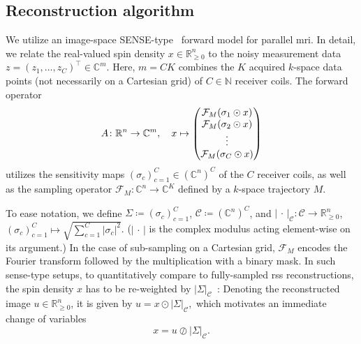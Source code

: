 \documentclass[twocolumn]{article}
\newcommand{\R}{\mathbb{R}}
\newcommand{\Function}[3]{#1\colon#2\to#3}
\begin{document}
\subsection{Reconstruction algorithm}%
\label{ssec:mri}
We utilize an image-space SENSE-type~\cite{pruessmann} forward model for parallel \gls{mri}.
In detail, we relate the real-valued spin density \( x \in \R^n_{\geq 0} \) to the noisy measurement data \( z = {(z_1,\dotsc,z_C)}^\top \in \mathbb{C}^{m} \).
Here, \( m = CK \) combines the \( K \) acquired \( k \)-space data points (not necessarily on a Cartesian grid) of \( C \in \mathbb{N} \) receiver coils.
The forward operator
\begin{equation}
	 \Function{A}{\R^n}{\mathbb{C}^m}, \quad x \mapsto \begin{pmatrix}
		\mathcal{F}_M(\sigma_1 \odot x) \\
		\mathcal{F}_M(\sigma_2 \odot x) \\
		\vdotswithin{\mathcal{F}_M(\sigma_1 \odot x)} \\
		\mathcal{F}_M(\sigma_{C} \odot x)
	\end{pmatrix}
\end{equation}
utilizes the sensitivity maps \( {(\sigma_c)}_{c=1}^{C} \in {(\mathbb{C}^n)}^{C} \) of the \( C \) receiver coils, as well as the sampling operator \( \Function{\mathcal{F}_M}{\mathbb{C}^n}{\mathbb{C}^{K}} \) defined by a \( k \)-space trajectory \( M \).

To ease notation, we define \( \Sigma \coloneqq {(\sigma_c)}_{c=1}^C \), \( \mathcal{C} \coloneqq {(\mathbb{C}^n)}^C \), and \( |\,\cdot\,|_{\mathcal{C}} \colon \mathcal{C} \to \R^n_{\geq 0} \), \( {(\sigma_c)}_{c=1}^C \mapsto \sqrt{\sum_{c=1}^C |\sigma_c|^2} \). (\( |\,\cdot\,| \) is the complex modulus acting element-wise on its argument.)
In the case of sub-sampling on a Cartesian grid, \( \mathcal{F}_M \) encodes the Fourier transform followed by the multiplication with a binary mask.
In such \gls{sense}-type setups, to quantitatively compare to fully-sampled \gls{rss} reconstructions, the spin density \( x \) has to be re-weighted by \( |\Sigma|_{\mathcal{C}} \)~\cite{uecker_image_2008}:
Denoting the reconstructed image \( u \in \R^n_{\geq 0} \), it is given by
\( 
	u = x \odot |\Sigma|_{\mathcal{C}},
\)
which motivates an immediate change of variables 
\begin{equation}
    	x = u \oslash |\Sigma|_{\mathcal{C}}.
    	\label{eq:change of variables}
\end{equation}
\end{document}
